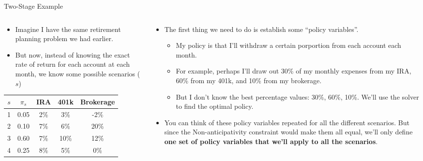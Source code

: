 \documentclass[10pt, aspectratio=169]{beamer}
\begin{document}
\begin{frame}{Two-Stage Example}
    \begin{columns}
        \begin{column}{0.5\textwidth}
            \begin{itemize}
                \item Imagine I have the same retirement planning problem we had earlier.
                \item But now, instead of knowing the exact rate of return for each account at each month, we know some possible scenarios ($s$)
            \end{itemize}
            \begin{tabular}{|c|c||c|c|c|}
                \hline
                $s$ & $\pi_s$ & IRA & 401k & Brokerage \\
                \hline \hline
                1 & 0.05 & 2\% & 3\% & -2\% \\
                \hline
                2 & 0.10 & 7\% & 6\% & 20\% \\
                \hline
                3 & 0.60 & 7\% & 10\% & 12\% \\
                \hline
                4 & 0.25 & 8\% & 5\% & 0\% \\
                \hline
            \end{tabular}
        \end{column}
        \begin{column}{0.5\textwidth}
            \begin{itemize}
                \item The first thing we need to do is establish some \enquote{policy variables}.
                \begin{itemize}
                    \item My policy is that I'll withdraw a certain porportion from each account each month.
                    \item For example, perhaps I'll draw out 30\% of my monthly expenses from my IRA, 60\% from my 401k, and 10\% from my brokerage.
                    \item But I don't know the best percentage values: 30\%, 60\%, 10\%. We'll use the solver to find the optimal policy.
                \end{itemize}
                \item You can think of these policy variables repeated for all the different scenarios. But since the Non-anticipativity constraint would make them all equal, we'll only define \textbf{one set of policy variables that we'll apply to all the scenarios}.
            \end{itemize}
        \end{column}
    \end{columns}
\end{frame}
\end{document}
